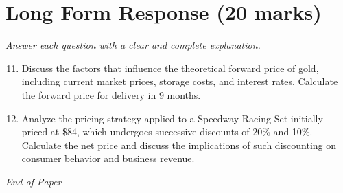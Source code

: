 \documentclass[12pt]{article}
\begin{document}
\section*{Long Form Response (20 marks)}
\textit{Answer each question with a clear and complete explanation.}
\begin{enumerate}[label=\arabic*.]
\setcounter{enumi}{10}
\item Discuss the factors that influence the theoretical forward price of gold, including current market prices, storage costs, and interest rates. Calculate the forward price for delivery in 9 months.
\item Analyze the pricing strategy applied to a Speedway Racing Set initially priced at \$84, which undergoes successive discounts of 20\% and 10\%. Calculate the net price and discuss the implications of such discounting on consumer behavior and business revenue.
\end{enumerate}

\vfill
\noindent\textit{End of Paper}
\end{document}

